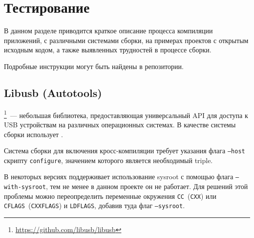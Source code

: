 
\section{Тестирование}

В данном разделе приводится краткое описание процесса компиляции приложений, с различными системами сборки, на примерах проектов с открытым исходным кодом, а также выявленных трудностей в процессе сборки.

Подробные инструкции могут быть найдены в репозитории.

\subsection{Libusb (Autotools)}

\libusb{}\footnote{\url{https://github.com/libusb/libusb}}~--- небольшая библиотека, предоставляющая универсальный API для доступа к USB устройствам на различных операционных системах.
В качестве системы сборки использует \autotools{}.

Система сборки \autotools{} для включения кросс-компиляции требует указания флага \texttt{--host} скрипту \texttt{configure}, значением которого является необходимый triple.

В некоторых версиях \autotools{} поддерживает использование sysroot с помощью флага \texttt{--with-sysroot}, тем не менее в данном проекте он не работает.
Для решений этой проблемы можно переопределить переменные окружения \texttt{CC}~(\texttt{CXX}) или \texttt{CFLAGS}~(\texttt{CXXFLAGS}) и \texttt{LDFLAGS}, добавив туда флаг \texttt{--sysroot}.



